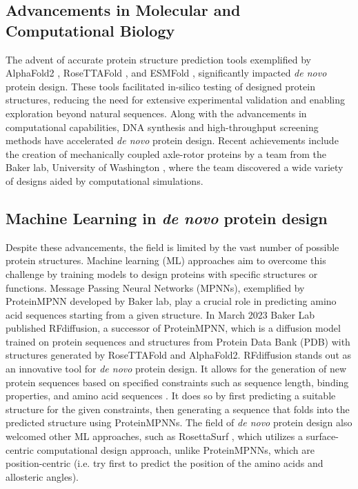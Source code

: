 \documentclass[11pt,a4paper]{article}
\begin{document}
\subsection{Advancements in Molecular and Computational Biology}

The advent of accurate protein structure prediction tools exemplified 
by AlphaFold2 \cite{jumper2021highly}, RoseTTAFold \cite
{baek2021accurate}, and ESMFold \cite{lin2022language}, significantly 
impacted \emph{de novo} protein design. These tools facilitated in-silico 
testing of designed protein structures, reducing the need for extensive 
experimental validation and enabling exploration beyond natural 
sequences.
Along with the advancements in computational capabilities, DNA synthesis 
and high-throughput screening methods have accelerated \emph{de novo} protein 
design. Recent achievements include the creation of mechanically 
coupled  axle-rotor proteins by a team from the Baker lab, University 
of Washington \cite{courbet2022computational,bakerlab}, where the team 
discovered a wide variety of designs aided by computational simulations.

\subsection{Machine Learning in \emph{de novo} protein design}

Despite these advancements, the field is limited by the vast number of 
possible protein structures. Machine learning (ML) approaches 
aim to overcome this challenge by training models to design proteins 
with specific structures or functions. Message Passing Neural Networks 
(MPNNs), exemplified by ProteinMPNN \cite{dauparas2022robust} developed 
by Baker lab, play a  crucial role in predicting amino acid sequences 
starting from a given structure.
In March 2023 Baker Lab published RFdiffusion, a successor of 
ProteinMPNN, which is a diffusion model trained on protein sequences and 
structures from Protein Data Bank (PDB) with structures generated by 
RoseTTAFold and AlphaFold2. RFdiffusion stands out as an innovative 
tool for \emph{de novo} protein design. It allows for the generation of new 
protein sequences based on specified constraints such as sequence 
length, binding properties, and amino acid sequences \cite{
watson2023novo}. It does so by first predicting a suitable structure 
for the given constraints, then generating a sequence that folds into 
the predicted structure using ProteinMPNNs.
The field of \emph{de novo} protein design also welcomed other ML approaches, 
such as RosettaSurf \cite{scheck2022rosettasurf}, which utilizes a surface-centric computational design approach,
unlike ProteinMPNNs, which are position-centric (i.e. try first to predict the position of the amino acids and allosteric angles).
\end{document}
